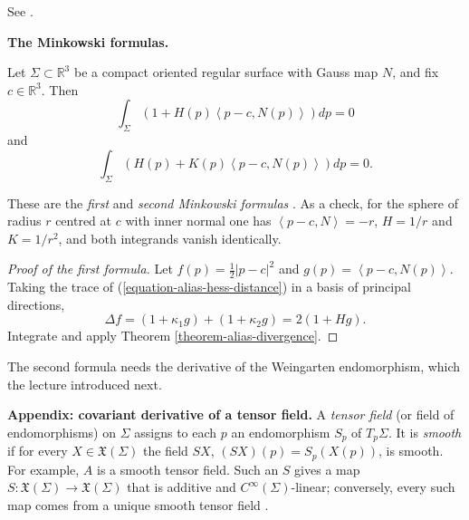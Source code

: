 See \cite[Section 3.1,
pp.~21--22]{alias2006analisis}.

\medskip\noindent
{\bf The Minkowski formulas.}

\begin{theorem}
\label{theorem-alias-minkowski}
Let $\Sigma\subset\mathbb{R}^3$ be a
compact oriented regular surface with
Gauss map $N$, and fix
$c\in\mathbb{R}^3$. Then
\begin{equation}
\label{equation-alias-minkowski-1}
\int_\Sigma\left(1+H(p)\left\langle{}
p-c,N(p)\right\rangle{}\right)dp=0
\end{equation}
and
\begin{equation}
\label{equation-alias-minkowski-2}
\int_\Sigma\left(H(p)+K(p)\left\langle{}
p-c,N(p)\right\rangle{}\right)dp=0.
\end{equation}
\end{theorem}

These are the \emph{first} and
\emph{second Minkowski formulas}
\cite[Theorem 3.3,
p.~23]{alias2006analisis}. As a check,
for the sphere of radius $r$ centred at
$c$ with inner normal one has
$\left\langle{} p-c,N\right\rangle{}=-r$,
$H=1/r$ and $K=1/r^2$, and both
integrands vanish identically.

\begin{proof}[Proof of the first formula]
Let $f(p)=\frac{1}{2}|p-c|^2$ and
$g(p)=\left\langle{} p-c,N(p)
\right\rangle{}$. Taking the trace of
(\ref{equation-alias-hess-distance}) in a
basis of principal directions,
\begin{equation}
\label{equation-alias-laplacian-f}
\Delta f
=(1+\kappa_1g)+(1+\kappa_2g)
=2(1+Hg).
\end{equation}
Integrate and apply Theorem
\ref{theorem-alias-divergence}.
\end{proof}

The second formula needs the
derivative of the Weingarten
endomorphism, which the lecture
introduced next.

\medskip\noindent
{\bf Appendix: covariant derivative of a
tensor field.}
A \emph{tensor field} (or field of
endomorphisms) on $\Sigma$ assigns to
each $p$ an endomorphism $S_p$ of
$T_p\Sigma$. It is \emph{smooth} if for
every $X\in\mathfrak{X}(\Sigma)$ the field
$SX$, $(SX)(p)=S_p(X(p))$, is smooth. For
example, $A$ is a smooth tensor field.
Such an $S$ gives a map
$S:\mathfrak{X}(\Sigma)\to
\mathfrak{X}(\Sigma)$ that is additive
and $C^\infty(\Sigma)$-linear; conversely,
every such map comes from a unique smooth
tensor field
\cite[Section 1.4,
p.~12]{alias2006analisis}.

